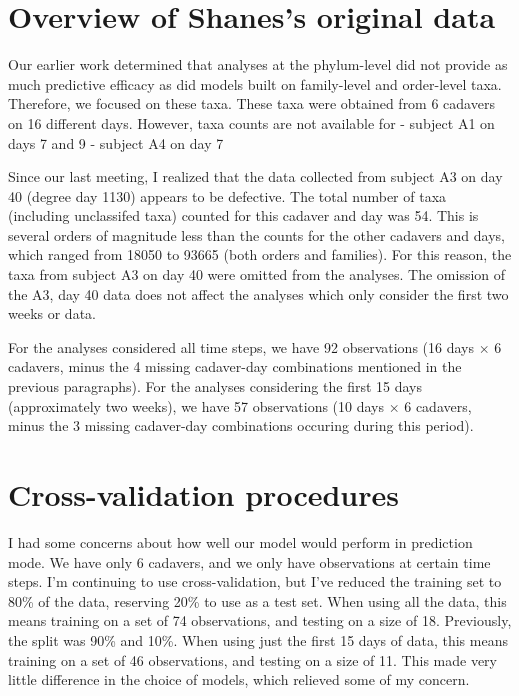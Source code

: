 \documentclass{article}
\begin{document}
\section{Overview of Shanes's original data}

Our earlier work determined that analyses at the phylum-level did not
provide as much predictive efficacy as did models built on
family-level and order-level taxa.  Therefore, we focused on these
taxa.  These taxa were obtained from 6 cadavers on 16 different days.
However, taxa counts are not available for
- subject A1 on days 7 and 9
- subject A4 on day 7


Since our last meeting, I realized that the data collected from
subject A3 on day 40 (degree day 1130) appears to be defective.  The
total number of taxa (including unclassifed taxa) counted for this
cadaver and day was 54.  This is several orders of magnitude less than
the counts for the other cadavers and days, which ranged from 18050 to
93665 (both orders and families).  For this reason, the taxa from
subject A3 on day 40 were omitted from the analyses.  The omission of
the A3, day 40 data does not affect the analyses which only consider
the first two weeks or data.

For the analyses considered all time steps, we have 92 observations
(16 days $\times$ 6 cadavers, minus the 4 missing cadaver-day
combinations mentioned in the previous paragraphs).  For the analyses
considering the first 15 days (approximately two weeks), we have 57
observations (10 days $\times$ 6 cadavers, minus the 3 missing
cadaver-day combinations occuring during this period).


\section{Cross-validation procedures}

I had some concerns about how well our model would perform in
prediction mode.  We have only 6 cadavers, and we only have
observations at certain time steps.  I'm continuing to use
cross-validation, but I've reduced the training set to 80\% of the
data, reserving 20\% to use as a test set.  When using all the data,
this means training on a set of 74 observations, and testing on a size
of 18.  Previously, the split was 90\% and 10\%.  When using just the
first 15 days of data, this means training on a set of 46 observations,
and testing on a size of 11.  This made very little difference in the
choice of models, which relieved some of my concern.
\end{document}
